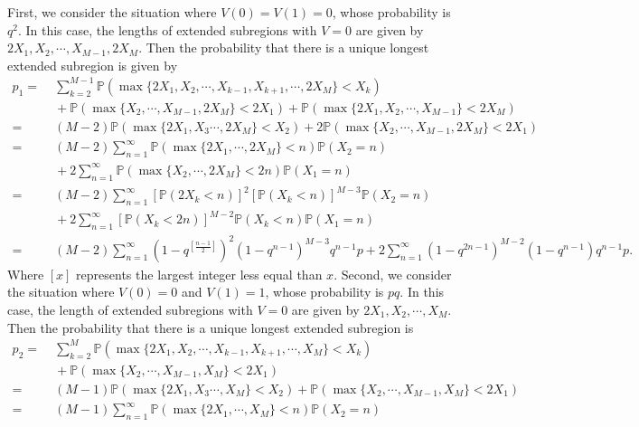 \documentclass[a4paper,11pt]{article}
\begin{document}
\begin{appendices}
First, we consider the situation where $V(0) = V(1) = 0$, whose probability is $q^2$. In this case, the lengths of extended subregions with $V = 0$ are given by $2 X_1, X_2, \cdots, X_{M-1}, 2 X_M$. Then the probability that there is a unique longest extended subregion is given by
\begin{equation*}
\begin{split}
p_1 = &\; \sum_{k=2}^{M-1} \mathbb{P}(\max\{2 X_1, X_2, \cdots, X_{k-1}, X_{k+1}, \cdots, 2 X_{M}\} < X_k) \\
&\; + \mathbb{P}(\max\{X_2, \cdots, X_{M-1}, 2 X_M\} < 2 X_1) + \mathbb{P}(\max\{2 X_1, X_2, \cdots, X_{M-1}\} < 2 X_M) \\
= &\; (M-2) \mathbb{P}(\max\{2 X_1, X_3 \cdots, 2 X_{M}\} < X_2) + 2 \mathbb{P}(\max\{X_2, \cdots, X_{M-1}, 2 X_M\} < 2 X_1) \\
= &\; (M-2) \sum_{n=1}^{\infty} \mathbb{P}(\max\{2 X_1, \cdots, 2 X_{M}\} < n) \mathbb{P}(X_2 = n) \\
&\; + 2 \sum_{n=1}^{\infty} \mathbb{P}(\max\{X_2, \cdots, 2 X_M\} < 2 n) \mathbb{P}(X_1 = n) \\
= &\; (M-2) \sum_{n=1}^{\infty} [\mathbb{P}(2 X_k < n)]^2 [\mathbb{P}(X_k < n)]^{M-3} \mathbb{P}(X_2 = n) \\
&\; + 2 \sum_{n=1}^{\infty} [\mathbb{P}(X_k < 2 n)]^{M-2} \mathbb{P}(X_k < n) \mathbb{P}(X_1 = n) \\
= &\; (M-2) \sum_{n=1}^{\infty} (1 - q^{[\frac{n-1}{2}]})^2 (1 - q^{n-1})^{M-3} q^{n-1} p + 2 \sum_{n=1}^{\infty} (1 - q^{2n-1})^{M-2} (1 - q^{n-1}) q^{n-1} p.
\end{split}
\end{equation*}
Where $[x]$ represents the largest integer less equal than $x$.
Second, we consider the situation where $V(0) = 0$ and $V(1) = 1$, whose probability is $p q$. In this case, the length of extended subregions with $V = 0$ are given by $2 X_1, X_2, \cdots, X_M$. Then the probability that there is a unique longest extended subregion is
\begin{equation*}
\begin{split}
p_2 = &\; \sum_{k=2}^{M} \mathbb{P}(\max\{2 X_1, X_2, \cdots, X_{k-1}, X_{k+1}, \cdots, X_{M}\} < X_k) \\
&\; + \mathbb{P}(\max\{X_2, \cdots, X_{M-1}, X_M\} < 2 X_1) \\
= &\; (M-1) \mathbb{P}(\max\{2 X_1, X_3 \cdots, X_{M}\} < X_2) + \mathbb{P}(\max\{X_2, \cdots, X_{M-1}, X_M\} < 2 X_1) \\
= &\; (M-1) \sum_{n=1}^{\infty} \mathbb{P}(\max\{2 X_1, \cdots, X_{M}\} < n) \mathbb{P}(X_2 = n) \\

\end{split}
\end{equation*}
\end{appendices}
\end{document}

